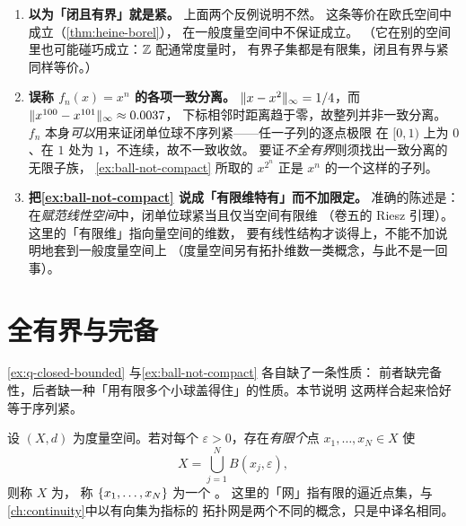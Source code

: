 \begin{pitfall}
  \begin{enumerate}[label=(\arabic*), leftmargin=1.6em]
    \item \textbf{以为「闭且有界」就是紧。} 上面两个反例说明不然。
          这条等价在欧氏空间中成立（\cref{thm:heine-borel}），
          在一般度量空间中不保证成立。
          （它在别的空间里也可能碰巧成立：\(\mathbb{Z}\) 配通常度量时，
          有界子集都是有限集，闭且有界与紧同样等价。）
    \item \textbf{误称 \(f_{n}(x)=x^{n}\) 的各项一致分离。}
          \(\lVert x-x^{2}\rVert_{\infty} = 1/4\)，而 \(\lVert x^{100}-x^{101}\rVert_{\infty} \approx 0.0037\)，
          下标相邻时距离趋于零，故整列并非一致分离。
          \(f_{n}\) 本身\emph{可以}用来证闭单位球不序列紧——任一子列的逐点极限
          在 \([0,1)\) 上为 \(0\)、在 \(1\) 处为 \(1\)，不连续，故不一致收敛。
          要证\emph{不全有界}则须找出一致分离的无限子族，
          \cref{ex:ball-not-compact} 所取的 \(x^{2^{n}}\) 正是 \(x^{n}\) 的一个这样的子列。
    \item \textbf{把\cref{ex:ball-not-compact} 说成「有限维特有」而不加限定。}
          准确的陈述是：在\emph{赋范线性空间}中，闭单位球紧当且仅当空间有限维
          （卷五的 Riesz 引理）。这里的「有限维」指向量空间的维数，
          要有线性结构才谈得上，不能不加说明地套到一般度量空间上
          （度量空间另有拓扑维数一类概念，与此不是一回事）。
  \end{enumerate}
\end{pitfall}

\section{全有界与完备}
\label{sec:totally-bounded}

\cref{ex:q-closed-bounded} 与\cref{ex:ball-not-compact} 各自缺了一条性质：
前者缺完备性，后者缺一种「用有限多个小球盖得住」的性质。本节说明
这两样合起来恰好等于序列紧。

\begin{definition}[全有界]
  \label{def:totally-bounded}
  设 \((X,d)\) 为度量空间。若对每个 \(\varepsilon>0\)，存在\emph{有限个}点
  \(x_{1},\dots,x_{N} \in X\) 使
  \begin{equation}
    \label{eq:eps-net}
    X = \bigcup_{j=1}^{N} B(x_{j},\varepsilon),
  \end{equation}
  则称 \(X\) 为，
  称 \(\left\{x_{1},\dots,x_{N}\right\}\) 为一个 。
  这里的「网」指有限的逼近点集，与\cref{ch:continuity}中以有向集为指标的
  拓扑网是两个不同的概念，只是中译名相同。
\end{definition}

